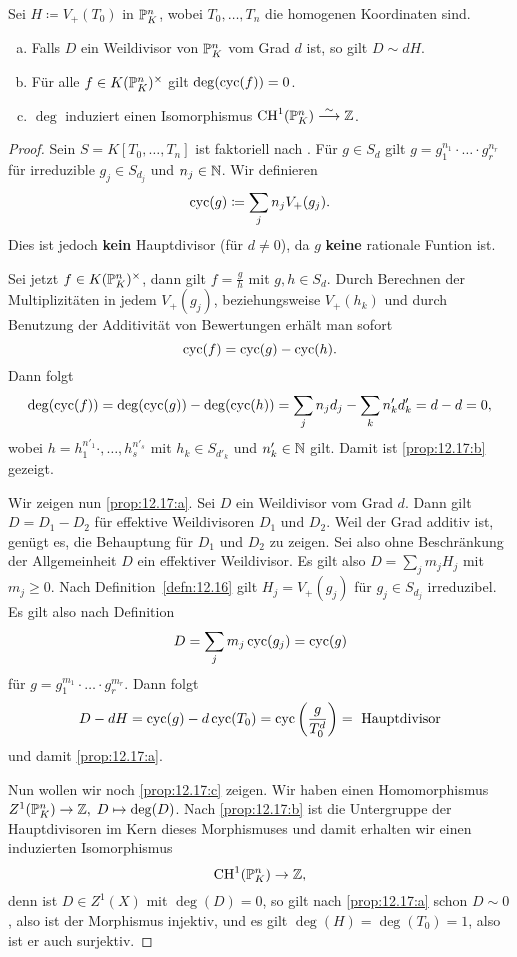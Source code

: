 \begin{prop}
\label{prop:12.17}
	Sei $H \coloneqq V_+(T_0)$ in $\P^n_K$, wobei $T_0,\ldots,T_n$ die homogenen Koordinaten sind.
	\begin{enumerate}[a)]
		\item\label{prop:12.17:a} Falls $D$ ein Weildivisor von $\P^n_K$ vom Grad $d$ ist, so gilt $D\sim dH$.
		\item\label{prop:12.17:b} Für alle $f \in K(\P^n_K)^\times$ gilt $\deg(\cyc(f)) = 0$.
		\item\label{prop:12.17:c} $\deg$ induziert einen Isomorphismus $\CH^1(\P^n_K)\simto \Z$.
	\end{enumerate}
	\begin{proof}
		Sein $S=K[T_0,\ldots,T_n]$ ist faktoriell nach \cite[Theorem~A.3]{gubler2014vorlesungsskript}. Für $g \in S_d$ gilt $g=g_1^{n_1}\cdot \ldots \cdot g_r^{n_r}$ für irreduzible $g_j\in S_{d_j}$ und $n_j \in \N$. Wir definieren
		\[
			\cyc(g)\coloneqq \sum_{j}n_jV_+(g_j).
		\]
		Dies ist jedoch \textbf{kein} Hauptdivisor (für $d \ne 0$), da $g$ \textbf{keine} rationale Funtion ist.

		Sei jetzt $f\in K(\P^n_K)^\times$, dann gilt $f=\frac{g}{h}$ mit $g,h\in S_d$. Durch Berechnen der Multiplizitäten in jedem $V_+(g_j)$, beziehungsweise $V_+(h_k)$ und durch Benutzung der Additivität von Bewertungen erhält man sofort
		\[
			\cyc(f) = \cyc(g) - \cyc(h).
		\]
		Dann folgt
		\[
			\deg(\cyc(f)) = \deg(\cyc(g)) - \deg(\cyc(h)) = \sum_j n_j d_j - \sum_k n_k'd_k' = d - d = 0,
		\]
		wobei $h = h_1^{n'_1}\cdot,\ldots,h_s^{n'_s}$ mit $h_k \in S_{d'_k}$ und $n'_k \in \N$ gilt. Damit ist \ref{prop:12.17:b} gezeigt.

		Wir zeigen nun \ref{prop:12.17:a}. Sei $D$ ein Weildivisor vom Grad $d$. Dann gilt $D=D_1-D_2$ für effektive Weildivisoren $D_1$ und $D_2$. Weil der Grad additiv ist, genügt es, die Behauptung für $D_1$ und $D_2$ zu zeigen. Sei also ohne Beschränkung der Allgemeinheit $D$ ein effektiver Weildivisor. Es gilt also $D = \sum_{j} m_j H_j$ mit $m_j\ge 0$. Nach Definition~\ref{defn:12.16} gilt $H_j=V_+(g_j)$ für $g_j \in S_{d_j}$ irreduzibel. Es gilt also nach Definition
		\[
			D = \sum_{j}m_j \cyc(g_j) = \cyc(g)
		\]
		für $g = g_1^{m_1}\cdot \ldots \cdot g_r^{m_r}$. Dann folgt
		\[
			D-dH = \cyc(g) - d \cyc(T_0) = \cyc\left(\frac{g}{T_0^d}\right) = \text{ Hauptdivisor}
		\]
		und damit \ref{prop:12.17:a}.

		Nun wollen wir noch \ref{prop:12.17:c} zeigen. Wir haben einen Homomorphismus $Z^1(\P^n_K) \to \Z,\; D \mapsto \deg(D)$. Nach \ref{prop:12.17:b} ist die Untergruppe der Hauptdivisoren im Kern dieses Morphismuses und damit erhalten wir einen induzierten Isomorphismus
		\[
			\CH^1(\P^n_K)\to \Z,
		\]
		denn ist $D \in Z^1(X)$ mit $\deg(D) = 0$, so gilt nach \ref{prop:12.17:a} schon $D \sim 0$, also ist der Morphismus injektiv, und es gilt $\deg(H) = \deg(T_0)=1$, also ist er auch surjektiv.
	\end{proof}
\end{prop}


